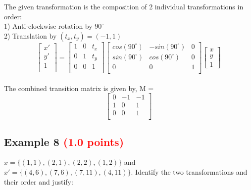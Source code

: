 \documentclass[answers]{exam}
\newcommand{\mypoints}[1]{\textcolor{red}{(#1 points)}}
\begin{document}
\begin{solution}
The given transformation is the composition of 2 individual transformations in order:\\
1) Anti-clockwise rotation by $90^{\circ}$\\
2) Translation by $(t_x, t_y) = (-1, 1)$\\
$$
\begin{bmatrix} 
x'\\
y'\\
1\\
\end{bmatrix}
=
\begin{bmatrix}
1 & 0 & t_x\\
0 & 1 & t_y\\
0 & 0 & 1\\
\end{bmatrix}
\begin{bmatrix}
cos(90^{\circ}) & -sin(90^{\circ}) & 0\\
sin(90^{\circ}) & cos(90^{\circ}) & 0\\
0 & 0 & 1\\
\end{bmatrix}
\begin{bmatrix}
x\\
y\\
1
\end{bmatrix}
$$\\
The combined transition matrix is given by, M =\\
$$
\begin{bmatrix}
0 & -1 & -1\\
1 & 0 & 1\\
0 & 0 & 1\\
\end{bmatrix}$$
\end{solution}

\subsection{Example 8 \mypoints{1.0}}
$x = \{(1,1), (2,1), (2,2), (1,2)\}$ and $x' = \{(4, 6), (7,6), (7,11), (4,11)\}$. Identify the two transformations and their order and justify:
\end{document}
